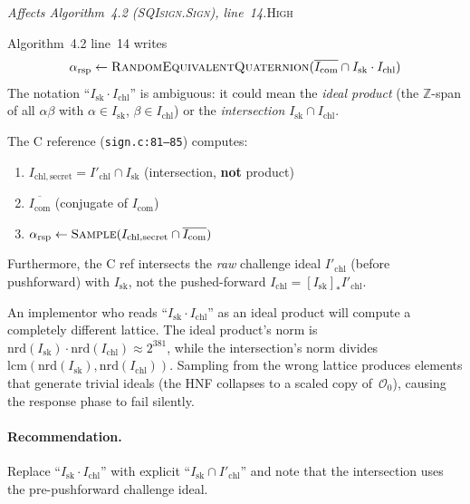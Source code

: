 \documentclass[a4paper,11pt]{article}
\newcommand{\algo}[1]{Algorithm~#1}
\newcommand{\high}{\textsc{\color{BurntOrange}High}}
\newcommand{\finding}[2]{\noindent\textit{#1}\hfill#2\par\smallskip}
\begin{document}
\finding{Affects \algo{4.2} (\textsc{SQIsign.Sign}),
line~14.}{\high}

\algo{4.2} line~14 writes
\[
  \alpha_{\mathrm{rsp}} \leftarrow
  \textsc{RandomEquivalentQuaternion}(
    \overline{I_{\mathrm{com}}} \cap I_{\mathrm{sk}} \cdot I_{\mathrm{chl}})
\]
The notation ``$I_{\mathrm{sk}} \cdot I_{\mathrm{chl}}$'' is
ambiguous: it could mean the \emph{ideal product} (the $\mathbb{Z}$-span
of all $\alpha\beta$ with $\alpha \in I_{\mathrm{sk}}$,
$\beta \in I_{\mathrm{chl}}$) or the \emph{intersection}
$I_{\mathrm{sk}} \cap I_{\mathrm{chl}}$.

The C reference (\texttt{sign.c:81--85}) computes:
\begin{enumerate}[nosep]
  \item $I_{\mathrm{chl,secret}} = I'_{\mathrm{chl}} \cap
        I_{\mathrm{sk}}$ \quad (intersection, \textbf{not} product)
  \item $\overline{I_{\mathrm{com}}}$ (conjugate of $I_{\mathrm{com}}$)
  \item $\alpha_{\mathrm{rsp}} \leftarrow
        \textsc{Sample}(I_{\mathrm{chl,secret}} \cap
        \overline{I_{\mathrm{com}}})$
\end{enumerate}

Furthermore, the C ref intersects the \emph{raw} challenge ideal
$I'_{\mathrm{chl}}$ (before pushforward) with $I_{\mathrm{sk}}$,
not the pushed-forward $I_{\mathrm{chl}} = [I_{\mathrm{sk}}]_*
I'_{\mathrm{chl}}$.

An implementor who reads ``$I_{\mathrm{sk}} \cdot I_{\mathrm{chl}}$''
as an ideal product will compute a completely different lattice.  The
ideal product's norm is
$\mathrm{nrd}(I_{\mathrm{sk}}) \cdot \mathrm{nrd}(I_{\mathrm{chl}})
\approx 2^{381}$, while the intersection's norm divides
$\mathrm{lcm}(\mathrm{nrd}(I_{\mathrm{sk}}),
\mathrm{nrd}(I_{\mathrm{chl}}))$. Sampling from the wrong lattice
produces elements that generate trivial ideals (the HNF collapses to
a scaled copy of~$\mathcal{O}_0$), causing the response phase to
fail silently.

\paragraph{Recommendation.}
Replace ``$I_{\mathrm{sk}} \cdot I_{\mathrm{chl}}$'' with explicit
``$I_{\mathrm{sk}} \cap I'_{\mathrm{chl}}$'' and note that the
intersection uses the pre-pushforward challenge ideal.

\end{document}
